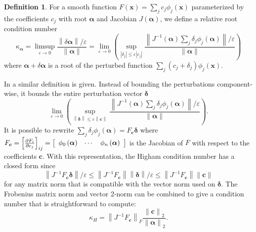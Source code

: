 \documentclass[3p, authoryear, square]{elsarticle}
\theoremstyle{definition}
\newtheorem{definition}{Definition}[section]
\newcommand{\eps}{\varepsilon}
\begin{document}
\begin{definition}\label{defn:abstract-cond-num}
For a smooth function \(F\left(\bm{x}\right) = \sum_j c_j
\phi_j\left(\bm{x}\right)\) parameterized by the coefficients
\(c_j\) with root \(\bm{\alpha}\) and Jacobian
\(J\left(\bm{\alpha}\right)\), we define a relative root condition
number
\begin{equation}
\kappa_{\bm{\alpha}} =
  \limsup_{\eps \to 0} \frac{\left \lVert\delta \bm{\alpha}
  \right \rVert / \eps}{\left \lVert\bm{\alpha}\right \rVert} =
  \lim_{\eps \to 0} \left(\sup_{\left|\delta_j\right| \leq
  \eps \left|c_j\right|} \frac{\left \lVert
  J^{-1}\left(\bm{\alpha}\right) \sum_j \delta_j
  \phi_j\left(\bm{\alpha}\right) \right \rVert / \eps}{
  \left \lVert\bm{\alpha}\right \rVert}\right)
\end{equation}
where \(\bm{\alpha} + \delta \bm{\alpha}\) is a root of the perturbed
function \(\sum_j (c_j + \delta_j) \phi_j\left(\bm{x}\right)\).
\end{definition}

In \cite[Chapter~25, Section 25.4]{Higham2002} a similar definition is
given. Instead of bounding the perturbations component-wise, it bounds
the entire perturbation vector \(\bm{\delta}\)
\begin{equation}
  \lim_{\eps \to 0} \left(\sup_{\left \lVert \bm{\delta} \right \rVert \leq
  \eps \left \lVert \bm{c} \right \rVert} \frac{\left \lVert
  J^{-1}\left(\bm{\alpha}\right) \sum_j \delta_j
  \phi_j\left(\bm{\alpha}\right) \right \rVert / \eps}{
  \left \lVert \bm{\alpha} \right \rVert}\right).
\end{equation}
It is possible to rewrite \(\sum_j \delta_j \phi_j\left(\bm{\alpha}\right) =
F_{\bm{c}} \bm{\delta}\) where \(F_{\bm{c}} =
\left[\frac{\partial F_i}{\partial c_j}\right]_{ij} =
\left[\begin{array}{c c c} \phi_0\left(\bm{\alpha}\right) & \cdots &
\phi_n\left(\bm{\alpha}\right) \end{array}\right]\) is the Jacobian of \(F\)
with respect to the coefficients \(\bm{c}\). With this representation, the
Higham condition number has a closed form since
\begin{equation}
  \left \lVert
  J^{-1} F_{\bm{c}} \bm{\delta} \right \rVert / \eps \leq
  \left \lVert J^{-1} F_{\bm{c}} \right \rVert \left \lVert \bm{\delta} \right
  \rVert / \eps \leq \left \lVert J^{-1} F_{\bm{c}} \right \rVert \left \lVert
  \bm{c} \right \rVert
\end{equation}
for any matrix norm that is compatible with the vector norm used on
\(\bm{\delta}\). The Frobenius matrix norm and vector 2-norm can be
combined to give a condition number that is straightforward to compute:
\begin{equation}\label{eq:higham-cond-num}
  \kappa_H = \left \lVert J^{-1} F_{\bm{c}} \right \rVert_F
  \frac{\left \lVert \bm{c}
  \right \rVert_2}{\left \lVert \bm{\alpha} \right \rVert_2}.
\end{equation}
\end{document}
